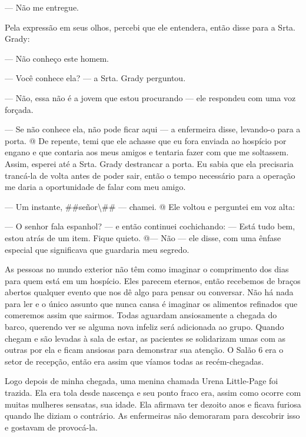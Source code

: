 --- Não me entregue.

Pela expressão em seus olhos, percebi que ele entendera, então disse
para a Srta. Grady:

--- Não conheço este homem.

--- Você conhece ela? --- a Srta. Grady perguntou.

--- Não, essa não é a jovem que estou procurando --- ele respondeu com
uma voz forçada.

--- Se não conhece ela, não pode ficar aqui --- a enfermeira disse,
levando-o para a porta. @ De repente, temi que ele achasse que eu fora
enviada ao hospício por engano e que contaria aos meus amigos e tentaria
fazer com que me soltassem. Assim, esperei até a Srta. Grady destrancar
a porta. Eu sabia que ela precisaria trancá-la de volta antes de poder
sair, então o tempo necessário para a operação me daria a oportunidade
de falar com meu amigo.

--- Um instante, \#\#señor\textbackslash{}\#\# --- chamei. @ Ele voltou
e perguntei em voz alta:

--- O senhor fala espanhol? --- e então continuei cochichando: --- Está
tudo bem, estou atrás de um item. Fique quieto. @--- Não --- ele disse,
com uma ênfase especial que significava que guardaria meu segredo.

As pessoas no mundo exterior não têm como imaginar o comprimento dos
dias para quem está em um hospício. Eles parecem eternos, então
recebemos de braços abertos qualquer evento que nos dê algo para pensar
ou conversar. Não há nada para ler e o único assunto que nunca cansa é
imaginar os alimentos refinados que comeremos assim que sairmos. Todas
aguardam ansiosamente a chegada do barco, querendo ver se alguma nova
infeliz será adicionada ao grupo. Quando chegam e são levadas à sala de
estar, as pacientes se solidarizam umas com as outras por ela e ficam
ansiosas para demonstrar sua atenção. O Salão 6 era o setor de recepção,
então era assim que víamos todas as recém-chegadas.

Logo depois de minha chegada, uma menina chamada Urena Little-Page foi
trazida. Ela era tola desde nascença e seu ponto fraco era, assim como
ocorre com muitas mulheres sensatas, sua idade. Ela afirmava ter dezoito
anos e ficava furiosa quando lhe diziam o contrário. As enfermeiras não
demoraram para descobrir isso e gostavam de provocá-la.

